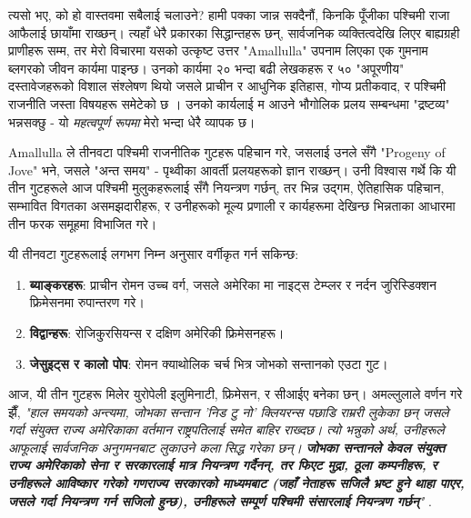 \documentclass[10pt,twocolumn,letterpaper]{article}
\begin{document}
त्यसो भए, को हो वास्तवमा सबैलाई चलाउने? हामी पक्का जान्न सक्दैनौं, किनकि पूँजीका पश्चिमी राजा आफैलाई छायाँमा राख्छन्। त्यहाँ धेरै प्रकारका सिद्धान्तहरू छन्, सार्वजनिक व्यक्तित्वदेखि लिएर बाह्यग्रही प्राणीहरू सम्म, तर मेरो विचारमा यसको उत्कृष्ट उत्तर "Amallulla" उपनाम लिएका एक गुमनाम ब्लगरको जीवन कार्यमा पाइन्छ। उनको कार्यमा २० भन्दा बढी लेखकहरू र ५० "अपूरणीय" दस्तावेजहरूको विशाल संश्लेषण थियो जसले प्राचीन र आधुनिक इतिहास, गोप्य प्रतीकवाद, र पश्चिमी राजनीति जस्ता विषयहरू समेटेको छ \cite{33,34}। उनको कार्यलाई म आउने भौगोलिक प्रलय सम्बन्धमा "द्रष्टव्य" भन्नसक्छु - यो \textit{महत्वपूर्ण रूपमा} मेरो भन्दा धेरै व्यापक छ।

Amallulla ले तीनवटा पश्चिमी राजनीतिक गुटहरू पहिचान गरे, जसलाई उनले सँगै "Progeny of Jove" भने, जसले "अन्त समय" - पृथ्वीका आवर्ती प्रलयहरूको ज्ञान राख्छन्। उनी विश्वास गर्थे कि यी तीन गुटहरूले आज पश्चिमी मुलुकहरूलाई सँगै नियन्त्रण गर्छन्, तर भिन्न उद्गम, ऐतिहासिक पहिचान, सम्भावित विगतका असमझदारीहरू, र उनीहरूको मूल्य प्रणाली र कार्यहरूमा देखिन्छ भिन्नताका आधारमा तीन फरक समूहमा विभाजित गरे।

यी तीनवटा गुटहरूलाई लगभग निम्न अनुसार वर्गीकृत गर्न सकिन्छ:

\begin{flushleft}
\begin{enumerate}
    \item \textbf{ब्याङ्करहरू}: प्राचीन रोमन उच्च वर्ग, जसले अमेरिका मा नाइट्स टेम्प्लर र नर्दन जुरिस्डिक्शन फ्रिमेसनमा रुपान्तरण गरे।
    \item \textbf{विद्वान्हरू}: रोजिकु्रसियन्स र दक्षिण अमेरिकी फ्रिमेसनहरू।
    \item \textbf{जेसुइट्स र कालो पोप}: रोमन क्याथोलिक चर्च भित्र जोभको सन्तानको एउटा गुट।
\end{enumerate}
\end{flushleft}

आज, यी तीन गुटहरू मिलेर युरोपेली इलुमिनाटी, फ्रिमेसन, र सीआईए बनेका छन्। अमल्लुलाले वर्णन गरे झैँ, \textit{"हाल समयको अन्त्यमा, जोभका सन्तान 'निड टु नो' क्लियरन्स पछाडि राम्ररी लुकेका छन् जसले गर्दा संयुक्त राज्य अमेरिकाका वर्तमान राष्ट्रपतिलाई समेत बाहिर राख्दछ। त्यो भन्नुको अर्थ, उनीहरूले आफूलाई सार्वजनिक अनुगमनबाट लुकाउने कला सिद्ध गरेका छन्। \textbf{जोभका सन्तानले केवल संयुक्त राज्य अमेरिकाको सेना र सरकारलाई मात्र नियन्त्रण गर्दैनन्, तर फिएट मुद्रा, ठूला कम्पनीहरू, र उनीहरूले आविष्कार गरेको गणराज्य सरकारको माध्यमबाट (जहाँ नेताहरू सजिलै भ्रष्ट हुने थाहा पाएर, जसले गर्दा नियन्त्रण गर्न सजिलो हुन्छ), उनीहरूले सम्पूर्ण पश्चिमी संसारलाई नियन्त्रण गर्छन्}"} \cite{33,34}.
\end{document}
